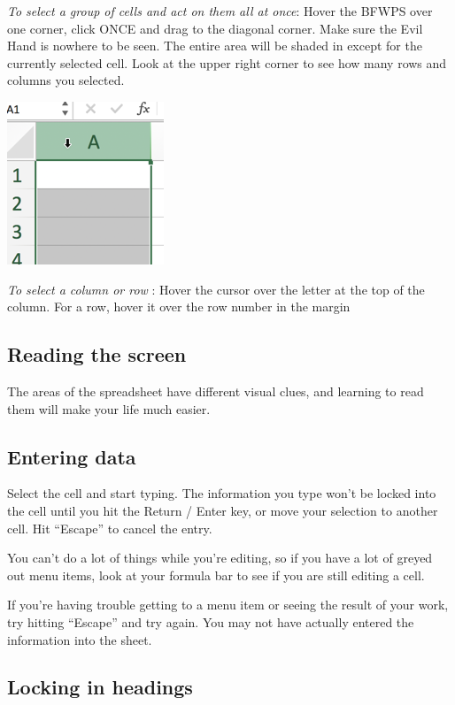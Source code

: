\documentclass[
  letterpaper,
  DIV=11,
  numbers=noendperiod]{scrreprt}
\begin{document}
\emph{To select a group of cells and act on them all at once}: Hover the
BFWPS over one corner, click ONCE and drag to the diagonal corner. Make
sure the Evil Hand is nowhere to be seen. The entire area will be shaded
in except for the currently selected cell. Look at the upper right
corner to see how many rows and columns you selected.

\includegraphics{./images/xl-refresher-columnselect.png}

\emph{To select a column or row} : Hover the cursor over the letter at
the top of the column. For a row, hover it over the row number in the
margin

\hypertarget{reading-the-screen}{%
\subsection{Reading the screen}\label{reading-the-screen}}

The areas of the spreadsheet have different visual clues, and learning
to read them will make your life much easier.

\hypertarget{entering-data}{%
\subsection{Entering data}\label{entering-data}}

Select the cell and start typing. The information you type won't be
locked into the cell until you hit the Return / Enter key, or move your
selection to another cell. Hit ``Escape'' to cancel the entry.

You can't do a lot of things while you're editing, so if you have a lot
of greyed out menu items, look at your formula bar to see if you are
still editing a cell.

If you're having trouble getting to a menu item or seeing the result of
your work, try hitting ``Escape'' and try again. You may not have
actually entered the information into the sheet.

\hypertarget{locking-in-headings}{%
\subsection{Locking in headings}\label{locking-in-headings}}
\end{document}
